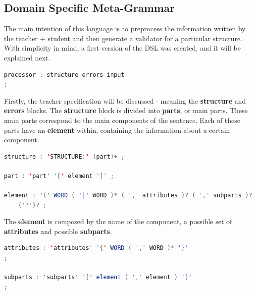\subsection{Domain Specific Meta-Grammar}
The main intention of this language is to preprocess the information written by the teacher + student and then generate a validator for a particular structure. With simplicity in mind, a first version of the \textsc{DSL} was created, and it will be explained next.

\begin{center}
\begin{minipage}{8cm}
\begin{lstlisting}[language=java, basicstyle=\small, label={lst:processor_prod}, caption=Processor production]
processor : structure errors input
;
\end{lstlisting}
\end{minipage}
\end{center}

Firstly, the teacher specification will be discussed - meaning the \textbf{structure} and \textbf{errors} blocks.
The \textbf{structure} block is divided into \textbf{parts}, or main parts. These main parts correspond to the main components of the sentence. Each of these parts have an \textbf{element} within, containing the information about a certain component.

\begin{center}
\begin{minipage}{14cm}
\begin{lstlisting}[language=java, basicstyle=\small, label={lst:dsl_struct_prod}, caption=DSL structure/part/element productions]
structure : 'STRUCTURE:' (part)+ ;

part : 'part' '[' element ']' ;

element : '(' WORD ( '|' WORD )* ( ',' attributes )? ( ',' subparts )? ')' 
    ('?')? ;
\end{lstlisting}
\end{minipage}
\end{center}

The \textbf{element} is composed by the name of the component, a possible set of \textbf{attributes} and possible \textbf{subparts}.

\begin{center}
\begin{minipage}{13cm}
\begin{lstlisting}[language=java, basicstyle=\small, label={lst:dsl_attrs_prod}, caption=DSL attributes/subparts productions]
attributes : 'attributes' '{' WORD ( ',' WORD )* '}'
;

subparts : 'subparts' '[' element ( ',' element ) ']'
;
\end{lstlisting}
\end{minipage}
\end{center}


